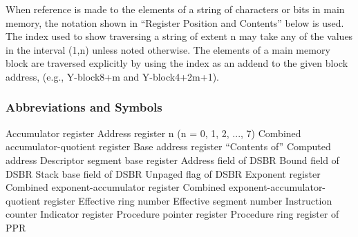 When reference is made to the elements of a string of characters or bits in main memory,
the notation shown in {``}Register Position and Contents'' below is used. The index used to show
traversing a string of extent n may take any of the values in the interval (1,n) unless noted
otherwise. The elements of a main memory block are traversed explicitly by using the index as an
addend to the given block address, (e.g., Y-block8+m and Y-block4+2m+1).


\subsubsection{Abbreviations and Symbols}


{Accumulator register}
{Address register n (n = 0, 1, 2, ..., 7)}
{Combined accumulator-quotient register}
{Base address register}
{{``}Contents of''}
{Computed address}
{Descriptor segment base register}
{Address field of DSBR}
{Bound field of DSBR}
{Stack base field of DSBR}
{Unpaged flag of DSBR}
{Exponent register}
{Combined exponent-accumulator register}
{Combined exponent-accumulator-quotient register}
{Effective ring number}
{Effective segment number}
{Instruction counter}
{Indicator register}
{Procedure pointer register}
{Procedure ring register of PPR}
